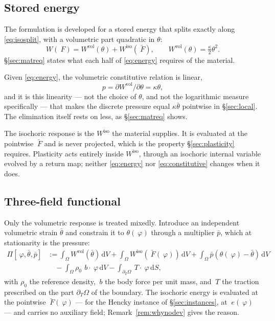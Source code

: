 \documentclass[11pt]{article}
\newcommand{\F}{~F}
\newcommand{\edev}{~e}
\newcommand{\disp}{~\varphi}
\newcommand{\bT}{~T}
\newcommand{\diff}{\,\mathrm{d}}
\newcommand{\supvol}{^{\mathrm{vol}}}
\newcommand{\supiso}{^{\mathrm{iso}}}
\theoremstyle{definition}
\theoremstyle{plain}
\begin{document}
\subsection{Stored energy}
\label{sec:energy}

The formulation is developed for a stored energy that splits exactly along
\eqref{eq:isosplit}, with a volumetric part quadratic in $\theta$:
\begin{equation}
  \label{eq:energy}
  W(\F) = W\supvol(\theta) + W\supiso(\bar{\F}),
  \qquad
  W\supvol(\theta) = \tfrac{\kappa}{2}\theta^2 .
\end{equation}
\S\ref{sec:matreq} states what each half of \eqref{eq:energy} requires of the
material.

Given \eqref{eq:energy}, the volumetric constitutive relation is linear,
\begin{equation}
  \label{eq:constitutive}
  p = \partial W\supvol/\partial\theta = \kappa\theta ,
\end{equation}
and it is this linearity --- not the choice of $\theta$, and not the
logarithmic measure specifically --- that makes the discrete pressure equal
$\kappa\bar\theta$ pointwise in \S\ref{sec:local}. The elimination itself rests
on less, as \S\ref{sec:matreq} shows.

The isochoric response is the $W\supiso$ the material supplies. It is
evaluated at the pointwise $\bar{\F}$ and is never projected, which is the
property \S\ref{sec:plasticity} requires. Plasticity acts entirely inside
$W\supiso$, through an isochoric internal variable evolved by a return map;
neither \eqref{eq:energy} nor \eqref{eq:constitutive} changes when it does.

\subsection{Three-field functional}
\label{sec:hw}

Only the volumetric response is treated mixedly. Introduce an independent
volumetric strain $\bar\theta$ and constrain it to $\theta(\disp)$ through a
multiplier $\bar p$, which at stationarity is the pressure:
\begin{equation}
  \label{eq:hw}
  \begin{split}
    \Pi[\disp, \bar\theta, \bar p] & :=
    \int_\Omega W\supvol(\bar\theta) \diff V
    + \int_\Omega W\supiso\!\left(\bar{\F}(\disp)\right) \diff V
    + \int_\Omega \bar p \left(\theta(\disp) - \bar\theta\right) \diff V
    \\
    & \quad
    - \int_\Omega \rho_0\, ~b \cdot \disp \diff V
    - \int_{\partial_T\Omega} \bT \cdot \disp \diff S ,
  \end{split}
\end{equation}
with $\rho_0$ the reference density, $~b$ the body force per unit mass, and
$\bT$ the traction prescribed on the part $\partial_T\Omega$ of the boundary.
The isochoric energy is evaluated at the pointwise $\bar{\F}(\disp)$
--- for the Hencky instance of \S\ref{sec:instances}, at $\edev(\disp)$ ---
and carries no auxiliary field; Remark~\ref{rem:whynodev} gives the reason.
\end{document}
